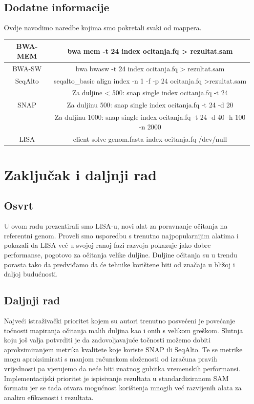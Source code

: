 \documentclass[times, utf8, diplomski]{fer}
\begin{document}
\section {Dodatne informacije}
Ovdje navodimo naredbe kojima smo pokretali svaki od mappera.

\begin{table}[H]
\centering
\begin{tabular}{|c|c|}
\hline
BWA-MEM & bwa mem -t 24 index ocitanja.fq > rezultat.sam\\
\hline
BWA-SW & bwa bwasw -t 24 index ocitanja.fq > rezultat.sam\\
\hline
SeqAlto & seqalto\_basic align index -n 1 -f -p 24 ocitanja.fq >rezultat.sam\\
\hline
 & Za duljine < 500: snap single index ocitanja.fq -t 24\\
SNAP & Za duljinu 500: snap single index ocitanja.fq -t 24 -d 20\\
& Za duljinu 1000: snap single index ocitanja.fq -t 24 -d 40 -h 100 -n 2000\\
\hline
LISA & client solve genom.fasta index ocitanja.fq /dev/null\\
\hline
\end{tabular}
\label{komande}
\end{table}


\chapter{Zaključak i daljnji rad}

\section{Osvrt}
U ovom radu prezentirali smo LISA-u, novi alat za poravnanje očitanja na referentni genom. Proveli smo usporedbu s trenutno najpopularnijim alatima i pokazali da LISA već u svojoj ranoj fazi razvoja pokazuje jako dobre performanse, pogotovo za očitanja velike duljine. Duljine očitanja su u trendu porasta tako da predviđamo da će tehnike korištene biti od značaja u bližoj i daljoj budućnosti.

\section{Daljnji rad}
Najveći istraživački prioritet kojem su autori trenutno posvećeni je povećanje točnosti mapiranja očitanja malih duljina kao i onih s velikom greškom. Slutnja koju još valja potvrditi je da zadovoljavajuće točnosti možemo dobiti aproksimiranjem metrika kvalitete koje koriste SNAP ili SeqAlto. Te se metrike mogu aproksimirati s manjom računskom složenosti od izračuna pravih vrijednosti pa vjerujemo da neće biti znatnog gubitka vremenskih performansi.\\
Implementacijski prioritet je ispisivanje rezultata u standardiziranom SAM formatu jer se tada otvara mogućnost korištenja mnogih već razvijenih alata za analizu efikasnosti i rezultata.
\end{document}
